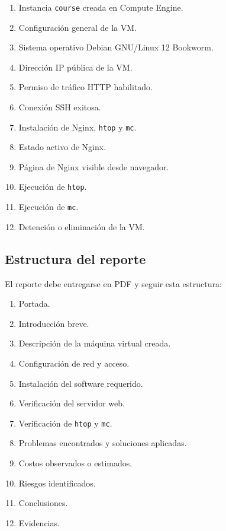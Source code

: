 \documentclass[
  coursetitle={Cómputo Nube y Tecnologías Emergentes},
  coursehours={96},
  coursedate={Verano 2026},
  doctype={Tarea 2},
  otherlangs={english,french},
  authorname={Lázaro},
  authorsurname={Bustio-Martínez},
  authortitle={PhD},
  role={Profesor Investigador},
  email={lbustio@inaoe.mx},
  phone={5559504000},
  ext={7459},
  institution={Instituto Nacional de Astrofísica, Óptica y Electrónica (INAOE)},
  department={Maestría en Ciencias en Tecnologías de Seguridad},
  address={Luis Enrique Erro 1, Sta. Ma. Tonantzintla, San Andrés Cholula, CP 72840, Puebla, México},
  margin={0.5in}
]{lbustio_lecture_notes}
\begin{document}
\begin{enumerate}
  \item Instancia \texttt{course} creada en Compute Engine.
  \item Configuración general de la VM.
  \item Sistema operativo Debian GNU/Linux 12 Bookworm.
  \item Dirección IP pública de la VM.
  \item Permiso de tráfico HTTP habilitado.
  \item Conexión SSH exitosa.
  \item Instalación de Nginx, \texttt{htop} y \texttt{mc}.
  \item Estado activo de Nginx.
  \item Página de Nginx visible desde navegador.
  \item Ejecución de \texttt{htop}.
  \item Ejecución de \texttt{mc}.
  \item Detención o eliminación de la VM.
\end{enumerate}

\subsection{Estructura del reporte}
\label{sec:tarea2-estructura-reporte}

El reporte debe entregarse en PDF y seguir esta estructura:

\begin{enumerate}
  \item Portada.
  \item Introducción breve.
  \item Descripción de la máquina virtual creada.
  \item Configuración de red y acceso.
  \item Instalación del software requerido.
  \item Verificación del servidor web.
  \item Verificación de \texttt{htop} y \texttt{mc}.
  \item Problemas encontrados y soluciones aplicadas.
  \item Costos observados o estimados.
  \item Riesgos identificados.
  \item Conclusiones.
  \item Evidencias.
\end{enumerate}
\end{document}
